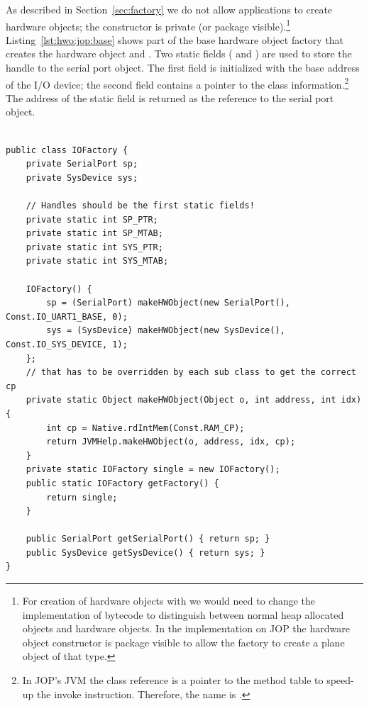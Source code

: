 As described in Section~\ref{sec:factory} we do not allow
applications to create hardware objects; the constructor is private
(or package visible).\footnote{For creation of hardware objects with
 we would need to change the implementation of bytecode
 to distinguish between normal heap allocated objects
and hardware objects. In the implementation on JOP the hardware
object constructor is package visible to allow the factory to create
a plane object of that type.} Listing~\ref{lst:hwo:jop:base} shows
part of the base hardware object factory that creates the hardware
object  and . Two static fields
( and ) are used to store the handle to
the serial port object. The first field is initialized with the base
address of the I/O device; the second field contains a pointer to the
class information.\footnote{In JOP's JVM the class reference is a
pointer to the method table to speed-up the invoke instruction.
Therefore, the name is .} The address of the
static field  is returned as the reference to the
serial port object.

\begin{lstlisting}[caption={Simplified version of the JOP base factory},
label=lst:hwo:jop:base]

public class IOFactory {
    private SerialPort sp;
    private SysDevice sys;

    // Handles should be the first static fields!
    private static int SP_PTR;
    private static int SP_MTAB;
    private static int SYS_PTR;
    private static int SYS_MTAB;

    IOFactory() {
        sp = (SerialPort) makeHWObject(new SerialPort(), Const.IO_UART1_BASE, 0);
        sys = (SysDevice) makeHWObject(new SysDevice(), Const.IO_SYS_DEVICE, 1);
    };
    // that has to be overridden by each sub class to get the correct cp
    private static Object makeHWObject(Object o, int address, int idx) {
        int cp = Native.rdIntMem(Const.RAM_CP);
        return JVMHelp.makeHWObject(o, address, idx, cp);
    }
    private static IOFactory single = new IOFactory();
    public static IOFactory getFactory() {
        return single;
    }

    public SerialPort getSerialPort() { return sp; }
    public SysDevice getSysDevice() { return sys; }
}
\end{lstlisting}

